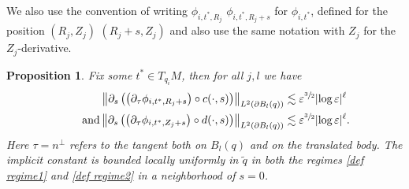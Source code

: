 \documentclass[10pt]{amsart}
\let\epsilon\varepsilon
\newtheorem{proposition}[theorem]{Proposition}
\theoremstyle{definition}
\newcommand\norm[1]{\left\lVert #1\right\rVert}
\let\de\partial
\let\eps\epsilon
\begin{document}
We also use the convention of writing $\phi_{i,t^*,R_j}$ \resp $\phi_{i,t^*,R_j+s}$ for $\phi_{i,t^*}$, defined for the position $(R_j,Z_j)$ \resp $(R_j+s,Z_j)$ and also use the same notation with $Z_j$ for the $Z_j$-derivative.

\begin{proposition}\label{prop deri}
Fix some $t^*\in T_{q_i}M$, then for all $j,l$ we have
\begin{align*}
\norm{\de_s \left(\left(\de_{\tau}\phi_{i,t^*,R_j+s}\right)\circ c(\cdot,s)\right)}_{L^2(\de B_l(q))}&\lesssim \eps^{\sfrac{3}{2}}|{\log\eps}|^\ell\\
\tag*{and}
\norm{\de_s \left(\left(\de_{\tau}\phi_{i,t^*,Z_j+s}\right)\circ d(\cdot,s)\right)}_{L^2(\de B_l(q))}&\lesssim \eps^{\sfrac{3}{2}}|{\log\eps}|^\ell.
\end{align*}
Here $\tau=n^\perp$ refers to the tangent both on $B_l(q)$ and on the translated body. The implicit constant is bounded locally uniformly in $\tilde{q}$ in both the regimes \eqref{def regime1} and \eqref{def regime2} in a neighborhood of $s=0$.
\end{proposition}
\end{document}

